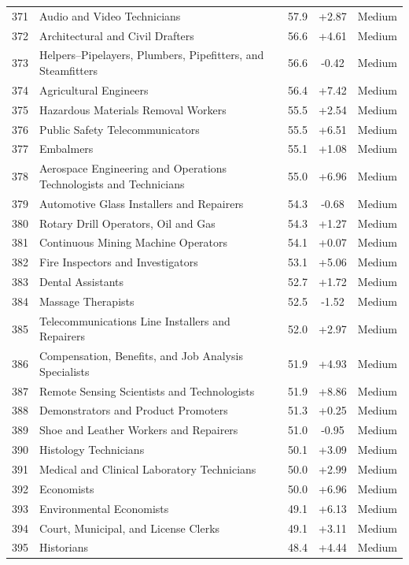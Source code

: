 {\begin{longtable}{rp{7cm}ccc}
371 & Audio and Video Technicians & 57.9 & +2.87 & Medium \\
372 & Architectural and Civil Drafters & 56.6 & +4.61 & Medium \\
373 & Helpers--Pipelayers, Plumbers, Pipefitters, and Steamfitters & 56.6 & -0.42 & Medium \\
374 & Agricultural Engineers & 56.4 & +7.42 & Medium \\
375 & Hazardous Materials Removal Workers & 55.5 & +2.54 & Medium \\
376 & Public Safety Telecommunicators & 55.5 & +6.51 & Medium \\
377 & Embalmers & 55.1 & +1.08 & Medium \\
378 & Aerospace Engineering and Operations Technologists and Technicians & 55.0 & +6.96 & Medium \\
379 & Automotive Glass Installers and Repairers & 54.3 & -0.68 & Medium \\
380 & Rotary Drill Operators, Oil and Gas & 54.3 & +1.27 & Medium \\
381 & Continuous Mining Machine Operators & 54.1 & +0.07 & Medium \\
382 & Fire Inspectors and Investigators & 53.1 & +5.06 & Medium \\
383 & Dental Assistants & 52.7 & +1.72 & Medium \\
384 & Massage Therapists & 52.5 & -1.52 & Medium \\
385 & Telecommunications Line Installers and Repairers & 52.0 & +2.97 & Medium \\
386 & Compensation, Benefits, and Job Analysis Specialists & 51.9 & +4.93 & Medium \\
387 & Remote Sensing Scientists and Technologists & 51.9 & +8.86 & Medium \\
388 & Demonstrators and Product Promoters & 51.3 & +0.25 & Medium \\
389 & Shoe and Leather Workers and Repairers & 51.0 & -0.95 & Medium \\
390 & Histology Technicians & 50.1 & +3.09 & Medium \\
391 & Medical and Clinical Laboratory Technicians & 50.0 & +2.99 & Medium \\
392 & Economists & 50.0 & +6.96 & Medium \\
393 & Environmental Economists & 49.1 & +6.13 & Medium \\
394 & Court, Municipal, and License Clerks & 49.1 & +3.11 & Medium \\
395 & Historians & 48.4 & +4.44 & Medium \\

\end{longtable}}
